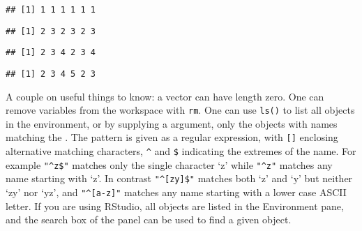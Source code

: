 \documentclass[paper=a4,10pt,div=17,headsepline,BCOR=12mm,twoside,open=right]{scrbook}\usepackage{knitr}
\begin{document}
\begin{knitrout}\footnotesize
{}\color{fgcolor}\begin{kframe}
\begin{alltt}
 \hlkwb{<-} \hlstd{(}\hlstd{,} \hlstd{)}
\end{alltt}
\begin{verbatim}
## [1] 1 1 1 1 1 1
\end{verbatim}
\begin{alltt}
 \hlopt{+} \hlopt{:}
\end{alltt}
\begin{verbatim}
## [1] 2 3 2 3 2 3
\end{verbatim}
\begin{alltt}
 \hlopt{+} \hlopt{:}
\end{alltt}
\begin{verbatim}
## [1] 2 3 4 2 3 4
\end{verbatim}
\begin{alltt}
 \hlopt{+} \hlopt{:}
\end{alltt}


{\ttfamily\noindent\color{warningcolor}{\#\# Warning in a + 1:4: longer object length is not a multiple of shorter object length}}\begin{verbatim}
## [1] 2 3 4 5 2 3
\end{verbatim}
\end{kframe}
\end{knitrout}


A couple on useful things to know: a vector can have length zero. One can remove variables from the workspace with \texttt{rm}. One can use \texttt{ls()} to list all objects in the environment, or by supplying a  argument, only the objects with names matching the . The pattern is given as a regular expression, with \verb|[]| enclosing alternative matching characters, \verb|^| and \verb|$| indicating the extremes of the name. For example \verb|"^z$"| matches only the single character `z' while \verb|"^z"| matches any name starting with `z'. In contrast \verb|"^[zy]$"| matches both `z' and `y' but neither `zy' nor `yz', and \verb|"^[a-z]"| matches any name starting with a lower case ASCII letter. If you are using RStudio, all objects are listed in the Environment pane, and the search box of the panel can be used to find a given object.
\end{document}
